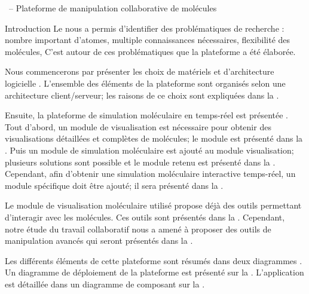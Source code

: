 \documentclass[myfrancais,ngerman,english,french]{mythesis}
\begin{document}
	\begin{mychapter}{\myShaddock\ -- Plateforme de manipulation collaborative de molécules}
		\begin{mysection}{Introduction}
			Le  nous a permis d'identifier des problématiques de recherche : nombre important d'atomes, multiple connaissances nécessaires, flexibilité des molécules, \myetc
			C'est autour de ces problématiques que la plateforme \myShaddock a été élaborée.

			Nous commencerons par présenter les choix de matériels et d'architecture logicielle .
			L'ensemble des éléments de la plateforme sont organisés selon une architecture client/serveur; les raisons de ce choix sont expliquées dans la .

			Ensuite, la plateforme de simulation moléculaire en temps-réel est présentée .
			Tout d'abord, un module de visualisation est nécessaire pour obtenir des visualisations détaillées et complètes de molécules; le module est présenté dans la .
			Puis un module de simulation moléculaire est ajouté au module visualisation; plusieurs solutions sont possible et le module retenu est présenté dans la .
			Cependant, afin d'obtenir une simulation moléculaire interactive temps-réel, un module spécifique doit être ajouté; il sera présenté dans la .

			Le module de visualisation moléculaire utilisé propose déjà des outils permettant d'interagir avec les molécules.
			Ces outils sont présentés dans la .
			Cependant, notre étude du travail collaboratif nous a amené à proposer des outils de manipulation avancés qui seront présentés dans la .

			Les différents éléments de cette plateforme sont résumés dans deux diagrammes .
			Un diagramme de déploiement  de la plateforme \myShaddock est présenté sur la .
			L'application  est détaillée dans un diagramme de composant  sur la .


\end{mysection}
\end{mychapter}
\end{document}
